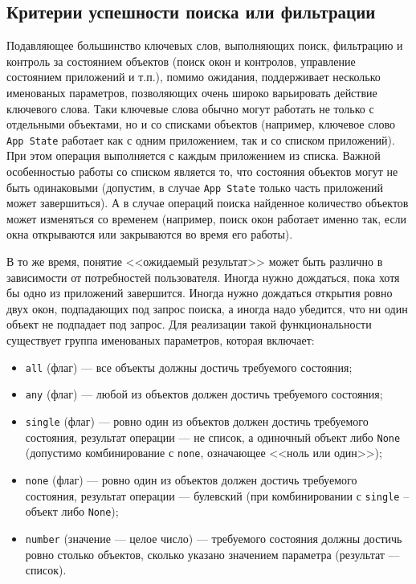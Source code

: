 \documentclass[11pt]{book} %
\begin{document}
\subsection{Критерии успешности поиска или фильтрации}
Подавляющее большинство ключевых слов, выполняющих поиск, фильтрацию и контроль за состоянием объектов (поиск окон и контролов, управление состоянием приложений и т.п.), помимо ожидания, поддерживает несколько именованых параметров, позволяющих очень широко варьировать действие ключевого слова. Таки ключевые слова обычно могут работать не только с отдельными объектами, но и со списками объектов (например, ключевое слово \verb|App State| работает как с одним приложением, так и со списком приложений). При этом операция выполняется с каждым приложением из списка. Важной особенностью работы со списком является то, что состояния объектов могут не быть одинаковыми (допустим, в случае \verb|App State| только часть приложений может завершиться). А в случае операций поиска найденное количество объектов может изменяться со временем (например, поиск окон работает именно так, если окна открываются или закрываются во время его работы).

В то же время, понятие <<ожидаемый результат>> может быть различно в зависимости от потребностей пользователя. Иногда нужно дождаться, пока хотя бы одно из приложений завершится. Иногда нужно дождаться открытия ровно двух окон, подпадающих под запрос поиска, а иногда надо убедится, что ни один объект не подпадает под запрос. Для реализации такой функциональности существует группа именованых параметров, которая включает:
\begin{itemize}
\item \verb|all| (флаг) --- все объекты должны достичь требуемого состояния;
\item \verb|any| (флаг) --- любой из объектов должен достичь требуемого состояния;
\item \verb|single| (флаг) --- ровно один из объектов должен достичь требуемого состояния, результат операции --- не список, а одиночный объект либо \verb|None| (допустимо комбинирование с \verb|none|, означающее <<ноль или один>>);
\item \verb|none| (флаг) --- ровно один из объектов должен достичь требуемого состояния, результат операции --- булевский (при комбинировании с \verb|single| -- объект либо \verb|None|);
\item \verb|number| (значение --- целое число) --- требуемого состояния должны достичь ровно столько объектов, сколько указано значением параметра (результат --- список).
\end{itemize}
\end{document}
